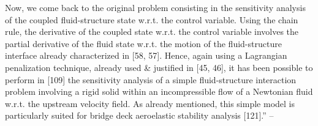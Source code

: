 \documentclass[oneside]{book}
\numberwithin{equation}{section}
\begin{document}
Now, we come back to the original problem consisting in the sensitivity analysis of the coupled fluid-structure state w.r.t. the control variable. Using the chain rule, the derivative of the coupled state w.r.t. the control variable involves the partial derivative of the fluid state w.r.t. the motion of the fluid-structure interface already characterized in [58, 57]. Hence, again using a Lagrangian penalization technique, already used \& justified in [45, 46], it has been possible to perform in [109] the sensitivity analysis of a simple fluid-structure interaction problem involving a rigid solid within an incompressible flow of a Newtonian fluid w.r.t. the upstream velocity field. As already mentioned, this simple model is particularly suited for bridge deck aeroelastic stability analysis [121].'' -- \cite[Chap. 1, Sect. 1.2, pp. 4--6]{Moubachir_Zolesio2006}
\end{document}

